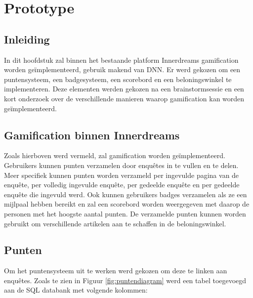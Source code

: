 
\chapter{Prototype}
\label{ch:prototype}

\section{Inleiding}

In dit hoofdstuk zal binnen het bestaande platform Innerdreams gamification worden geïmplementeerd, gebruik makend van DNN. Er werd gekozen om een puntensysteem, een badgesysteem, een scorebord en een beloningswinkel te implementeren. Deze elementen werden gekozen na een brainstormsessie en een kort onderzoek over de verschillende manieren waarop gamification kan worden geïmplementeerd.

\section{Gamification binnen Innerdreams}

Zoals hierboven werd vermeld, zal gamification worden geïmplementeerd. Gebruikers kunnen punten verzamelen door enquêtes in te vullen en te delen. Meer specifiek kunnen punten worden verzameld per ingevulde pagina van de enquête, per volledig ingevulde enquête, per gedeelde enquête en per gedeelde enquête die ingevuld werd. Ook kunnen gebruikers badges verzamelen als ze een mijlpaal hebben bereikt en zal een scorebord worden weergegeven met daarop de personen met het hoogste aantal punten. De verzamelde punten kunnen worden gebruikt om verschillende artikelen aan te schaffen in de beloningswinkel.

\section{Punten}

Om het puntensysteem uit te werken werd gekozen om deze te linken aan enquêtes. Zoals te zien in Figuur \ref{fig:puntendiagram} werd een tabel toegevoegd aan de SQL databank met volgende kolommen:

